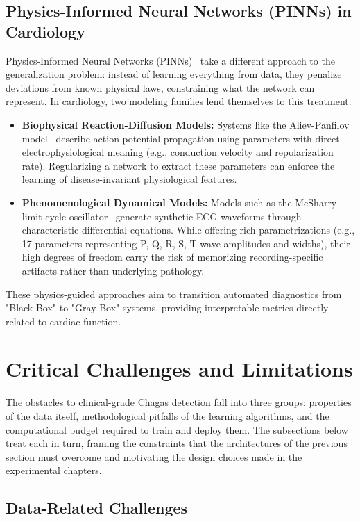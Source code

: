 \subsection{Physics-Informed Neural Networks (PINNs) in Cardiology}

Physics-Informed Neural Networks (PINNs)~\cite{raissi2019physics} take a different approach to the generalization problem: instead of learning everything from data, they penalize deviations from known physical laws, constraining what the network can represent. In cardiology, two modeling families lend themselves to this treatment:
\begin{itemize}
    \item \textbf{Biophysical Reaction-Diffusion Models:} Systems like the Aliev-Panfilov model~\cite{aliev1996simple} describe action potential propagation using parameters with direct electrophysiological meaning (e.g., conduction velocity and repolarization rate). Regularizing a network to extract these parameters can enforce the learning of disease-invariant physiological features.
    \item \textbf{Phenomenological Dynamical Models:} Models such as the McSharry limit-cycle oscillator~\cite{mcsharry2003dynamical} generate synthetic ECG waveforms through characteristic differential equations. While offering rich parametrizations (e.g., 17 parameters representing P, Q, R, S, T wave amplitudes and widths), their high degrees of freedom carry the risk of memorizing recording-specific artifacts rather than underlying pathology.
\end{itemize}
These physics-guided approaches aim to transition automated diagnostics from "Black-Box" to "Gray-Box" systems, providing interpretable metrics directly related to cardiac function.

\section{Critical Challenges and Limitations}

The obstacles to clinical-grade Chagas detection fall into three groups: properties of the data itself, methodological pitfalls of the learning algorithms, and the computational budget required to train and deploy them. The subsections below treat each in turn, framing the constraints that the architectures of the previous section must overcome and motivating the design choices made in the experimental chapters.

\subsection{Data-Related Challenges}

